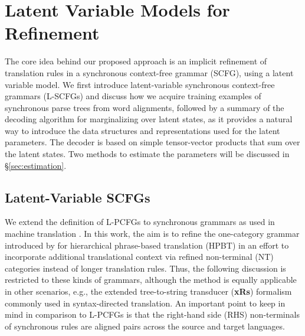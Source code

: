 \documentclass[11pt]{article}
\begin{document}
\section{Latent Variable Models for Refinement}
The core idea behind our proposed approach is an implicit refinement of translation rules in a synchronous context-free grammar (SCFG), using a latent variable model.  
We first introduce latent-variable synchronous context-free grammars (L-SCFGs) and discuss how we acquire training examples of synchronous parse trees from word alignments, followed by a summary of the decoding algorithm for marginalizing over latent states, as it provides a natural way to introduce the data structures and representations used for the latent parameters.  
The decoder is based on simple tensor-vector products that sum over the latent states.  
Two methods to estimate the parameters will be discussed in \S\ref{sec:estimation}. 

\subsection{Latent-Variable SCFGs}
\label{sec:formalism}
We extend the definition of L-PCFGs \cite{Matsuzaki2005,Petrov2006} to synchronous grammars as used in machine translation \cite{Galley2004,Chiang2005}. 
In this work, the aim is to refine the one-category grammar introduced by  for hierarchical phrase-based translation (HPBT) in an effort to incorporate additional translational context via refined non-terminal (NT) categories instead of longer translation rules.  
Thus, the following discussion is restricted to these kinds of grammars, although the method is equally applicable in other scenarios, e.g., the extended tree-to-string transducer ({\bf xRs}) formalism \cite{Huang2006,Graehl2008} commonly used in syntax-directed translation.  
An important point to keep in mind in comparison to L-PCFGs is that the right-hand side (RHS) non-terminals of synchronous rules are aligned pairs across the source and target languages.  
\end{document}
